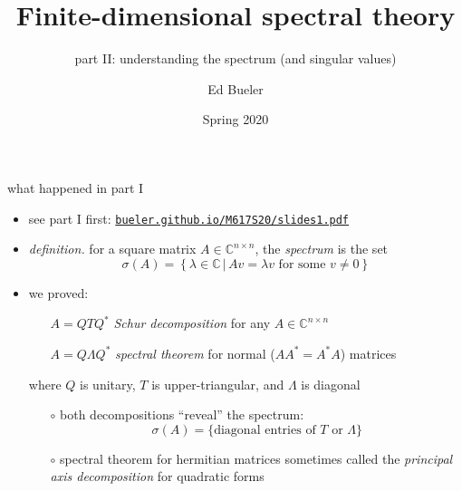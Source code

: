 \documentclass[10pt,hyperref]{beamer}
\title[Finite-dimensional spectral theory II]{Finite-dimensional spectral theory}
\subtitle{part II: understanding the spectrum (and singular values)}
\author{Ed Bueler}
\institute[MATH 617]{MATH 617 Functional Analysis}
\date{Spring 2020}
\newcommand{\CC}{\mathbb{C}}
\begin{document}
\beamertemplatenavigationsymbolsempty


\begin{frame}
  \maketitle
\end{frame}


\begin{frame}{what happened in part I}

\begin{itemize}
\item see part I first: \quad \href{http://bueler.github.io/M617S20/slides1.pdf}{\texttt{bueler.github.io/M617S20/slides1.pdf}}
\item \emph{definition.} for a square matrix $A\in\CC^{n\times n}$, the \emph{spectrum} is the set
    $$\sigma(A)=\left\{\lambda\in\CC\,\big|\,Av=\lambda v \text{ for some }v\ne 0\right\}$$
\item we proved:
    \begin{itemize}
    \item[] $A = Q T Q^*$ \quad \emph{Schur decomposition} \quad for any $A \in \CC^{n\times n}$
    \item[] $A = Q \Lambda Q^*$ \quad \emph{spectral theorem} \quad for normal ($AA^*=A^*A$) matrices
    \end{itemize}
where $Q$ is unitary, $T$ is upper-triangular, and $\Lambda$ is diagonal
    \begin{itemize}
    \item[$\circ$] both decompositions ``reveal'' the spectrum:
      $$\sigma(A) = \{\text{diagonal entries of $T$ or $\Lambda$}\}$$
    \item[$\circ$] spectral theorem for hermitian matrices sometimes called the \emph{principal axis decomposition} for quadratic forms
    \end{itemize}
\end{itemize}
\end{frame}
\end{document}
